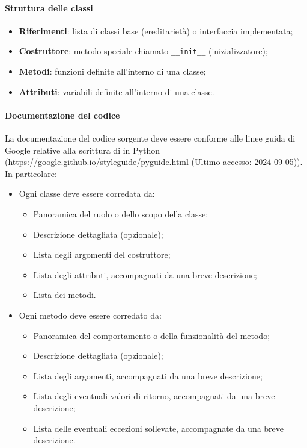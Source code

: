 \paragraph*{Struttura delle classi}
\begin{itemize}
  \item \textbf{Riferimenti}: lista di classi base (ereditarietà) o interfaccia implementata;
  \item \textbf{Costruttore}: metodo speciale chiamato \verb|__init__| (inizializzatore);
  \item \textbf{Metodi}: funzioni definite all'interno di una classe;
  \item \textbf{Attributi}: variabili definite all'interno di una classe.
\end{itemize}

\paragraph*{Documentazione del codice}
\par La documentazione del codice sorgente deve essere conforme alle linee guida di Google relative alla scrittura di  in Python (\href{https://google.github.io/styleguide/pyguide.html}{https://google.github.io/styleguide/pyguide.html} (Ultimo accesso: 2024-09-05)). In particolare:
\begin{itemize}
  \item Ogni classe deve essere corredata da:
  \begin{itemize}
    \item Panoramica del ruolo o dello scopo della classe;
    \item Descrizione dettagliata (opzionale);
    \item Lista degli argomenti del costruttore;
    \item Lista degli attributi, accompagnati da una breve descrizione;
    \item Lista dei metodi.
  \end{itemize}
  \item Ogni metodo deve essere corredato da:
  \begin{itemize}
    \item Panoramica del comportamento o della funzionalità del metodo;
    \item Descrizione dettagliata (opzionale);
    \item Lista degli argomenti, accompagnati da una breve descrizione;
    \item Lista degli eventuali valori di ritorno, accompagnati da una breve descrizione;
    \item Lista delle eventuali eccezioni sollevate, accompagnate da una breve descrizione.
  \end{itemize}
\end{itemize}

